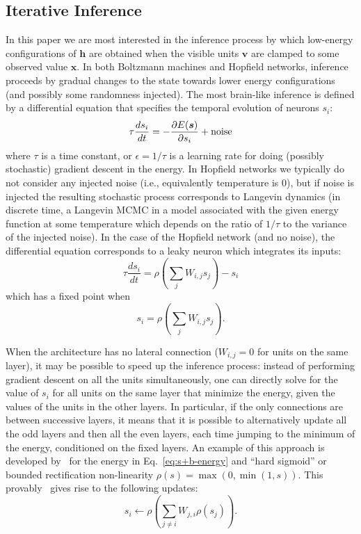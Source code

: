 \documentclass{article}
\newcommand   \vv{{\bm v}}
\newcommand   \vx{{\bm x}}
\newcommand   \vh{{\bm h}}
\newcommand   \vs{{\bm s}}
\begin{document}
\subsection{Iterative Inference}

In this paper we are most interested in the inference process by which low-energy
configurations of $\vh$ are obtained when the visible units $\vv$ are clamped
to some observed value $\vx$. In both Boltzmann machines and Hopfield networks,
inference proceeds by gradual changes to the state towards lower energy
configurations (and possibly some randomness injected). The most brain-like
inference is defined by a differential equation that specifies the temporal
evolution of neurons $s_i$:
\begin{equation}
  \label{eq:dsdt}
  \tau \frac{ds_i}{dt} = - \frac{\partial E(\vs)}{\partial s_i} + {\rm noise}
\end{equation}
where $\tau$ is a time constant, or $\epsilon=1/\tau$ is a learning rate for doing
(possibly stochastic) gradient descent in the energy. In Hopfield networks we
typically do not consider any injected noise (i.e., equivalently temperature is 0), but if noise is injected the resulting
stochastic process corresponds to Langevin dynamics (in discrete time, a Langevin
MCMC in a model associated with the given energy function at some temperature which
depends on the ratio of $1/\tau$ to the variance of the injected noise).
In the case of the Hopfield network (and no noise), the differential equation corresponds
to a leaky neuron which integrates its inputs:
\begin{equation}
  \tau \frac{ds_i}{dt} = \rho(\sum_j W_{i,j} s_j) - s_i
\end{equation}
which has a fixed point when 
\begin{equation}
   s_i = \rho(\sum_j W_{i,j} s_j).
\end{equation}

When the architecture has no lateral connection ($W_{i,j}=0$ for units on the same layer),
it may be possible to speed up the inference process: instead of performing
gradient descent on all the units simultaneously, one can directly solve
for the value of $s_i$ for all units on the same layer that minimize the
energy, given the values of the units in the other layers. In particular,
if the only connections are between successive layers, it means that it is
possible to alternatively update all the odd layers and then all the even
layers, each time jumping to the minimum of the energy, conditioned on 
the fixed layers. An example of this approach is developed by~\citet{Scellier+Bengio-arxiv2016}
for the energy in Eq.~\ref{eq:s+b-energy} and ``hard sigmoid''
or bounded rectification non-linearity $\rho(s)=\max(0,\min(1,s))$.
This provably~\citep{Scellier+Bengio-arxiv2016} gives rise to the following updates:
\begin{equation}
  \label{eq:direct}
   s_i \leftarrow \rho(\sum_{j\neq i} W_{j,i} \rho(s_j)). %
\end{equation}
\end{document}
